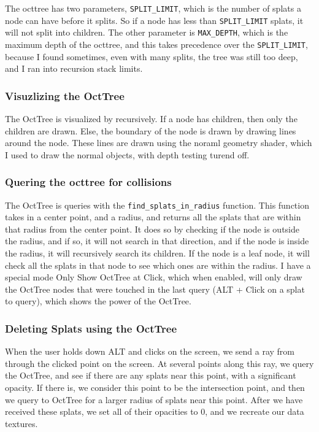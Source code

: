 \documentclass {article}
\begin{document}
The octtree has two parameters, \lstinline[style=inlinecode]{SPLIT_LIMIT}, which is the number of splats a node can have before it splits. So if a node has less than \lstinline[style=inlinecode]{SPLIT_LIMIT} splats, it will not split into children. The other parameter is \lstinline[style=inlinecode]{MAX_DEPTH}, which is the maximum depth of the octtree, and this takes precedence over the \lstinline[style=inlinecode]{SPLIT_LIMIT}, because I found sometimes, even with many splits, the tree was still too deep, and I ran into recursion stack limits.



\subsubsection{Visuzlizing the OctTree}

The OctTree is visualized by recursively. If a node has children, then only the children are drawn. Else, the boundary of the node is drawn by drawing lines around the node. These lines are drawn using the noraml geometry shader, which I used to draw the normal objects, with depth testing turend off.


\subsubsection{Quering the octtree for collisions}
The OctTree is queries with the \lstinline[style=inlinecode]{find_splats_in_radius} function. This function takes in a center point, and a radius, and returns all the splats that are within that radius from the center point. It does so by checking if the node is outside the radius, and if so, it will not search in that direction, and if the node is inside the radius, it will recursively search its children. If the node is a leaf node, it will check all the splats in that node to see which ones are within the radius. I have a special mode Only Show OctTree at Click, which when enabled, will only draw the OctTree nodes that were touched in the last query (ALT + Click on a splat to query), which shows the power of the OctTree.



\subsubsection{Deleting Splats using the OctTree}
When the user holds down ALT and clicks on the screen, we send a ray from through the clicked point on the screen. At several points along this ray, we query the OctTree, and see if there are any splats near this point, with a significant opacity. If there is, we consider this point to be the intersection point, and then we query to OctTree for a larger radius of splats near this point. After we have received these splats, we set all of their opacities to 0, and we recreate our data textures. 
\end{document}
